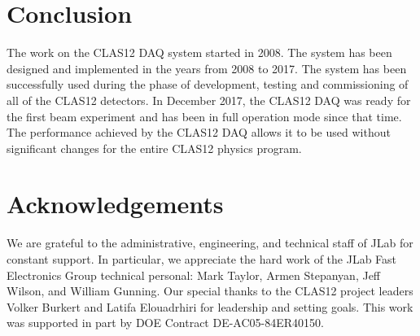 \section{Conclusion}

The work on the CLAS12 DAQ system started in 2008. The system has been designed and implemented in the years from 2008 to 2017. The system has been successfully used during the phase of development, testing and commissioning of all of the CLAS12 detectors. In December 2017, the CLAS12 DAQ was ready for the first beam experiment and has been in full operation mode since that time. The performance achieved by the CLAS12 DAQ allows it to be used without significant changes for the entire CLAS12 physics program.

\section{Acknowledgements}

We are grateful to the administrative, engineering, and technical staff of JLab for constant support. In particular, we appreciate the hard work of the JLab Fast Electronics Group technical personal: Mark Taylor, Armen Stepanyan, Jeff Wilson, and William Gunning. Our special thanks to the CLAS12 project leaders Volker Burkert and Latifa Elouadrhiri for leadership and setting goals. This work was supported in part by DOE Contract DE-AC05-84ER40150.

